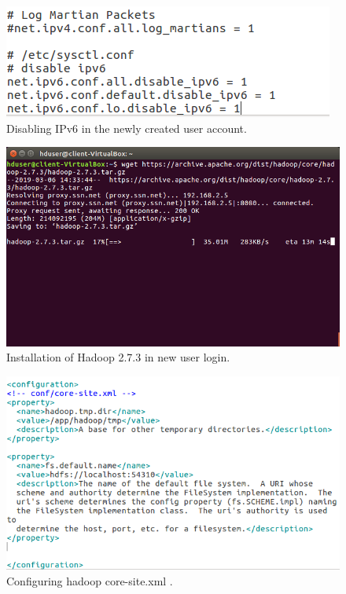 \documentclass[a4paper,10pt]{article}
\begin{document}
\begin{figure}[h]
	\includegraphics[scale=0.34,center]{exptTwoScreenShot/fig5Two.png}
	\caption{Disabling IPv6 in the newly created user account.}
	\label{fig:5.2}
\end{figure}

\begin{figure}[h]
	\includegraphics[scale=0.30,center]{exptTwoScreenShot/fig6.png}
	\caption{Installation of Hadoop 2.7.3 in new user login.}
	\label{fig:6}
\end{figure}
\newpage
\begin{figure}[h]
	\includegraphics[scale=0.30,center]{exptTwoScreenShot/fig7.png}
	\caption{Configuring hadoop core-site.xml .}
	\label{fig:7}
\end{figure}
\end{document}
